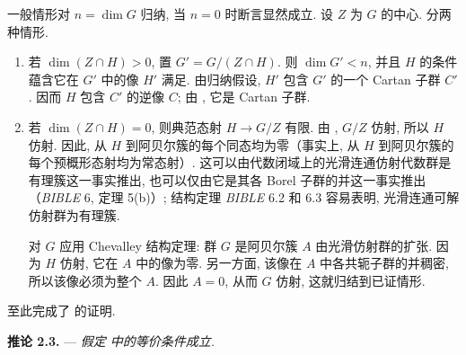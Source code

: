 一般情形对 \(n=\dim G\) 归纳, 当 \(n=0\) 时断言显然成立. 设 \(Z\) 为 \(G\) 的中心. 分两种情形.

\begin{enumerate}
\item[\(1^\circ\)]  若 \(\dim(Z\cap H)>0\), 置 \(G'=G/(Z\cap H)\). 则 \(\dim G'<n\), 并且 \(H\) 的条件  蕴含它在 \(G'\) 中的像 \(H'\) 满足. 由归纳假设, \(H'\) 包含 \(G'\) 的一个 Cartan 子群 \(C'\). 因而 \(H\) 包含 \(C'\) 的逆像 \(C\); 由 , 它是 Cartan 子群.

\item[\(2^\circ\)]  若 \(\dim(Z\cap H)=0\), 则典范态射 \(H\to G/Z\) 有限. 由 , \(G/Z\) 仿射, 所以 \(H\) 仿射. 因此, 从 \(H\) 到阿贝尔簇的每个同态均为零（事实上, 从 \(H\) 到阿贝尔簇的每个预概形态射均为常态射）. 这可以由代数闭域上的光滑连通仿射代数群是有理簇这一事实推出, 也可以仅由它是其各 Borel 子群的并这一事实推出（\emph{BIBLE} 6, 定理 5(b)）; 结构定理 \emph{BIBLE} 6.2 和 6.3 容易表明, 光滑连通可解仿射群为有理簇.

  对 \(G\) 应用 Chevalley 结构定理: 群 \(G\) 是阿贝尔簇 \(A\) 由光滑仿射群的扩张. 因为 \(H\) 仿射, 它在 \(A\) 中的像为零. 另一方面, 该像在 \(A\) 中各共轭子群的并稠密, 所以该像必须为整个 \(A\). 因此 \(A=0\), 从而 \(G\) 仿射, 这就归结到已证情形.
\end{enumerate}

至此完成了  的证明.

\medskip
\noindent{}\textbf{推论 2.3.} ---
\textit{假定  中的等价条件成立.}

